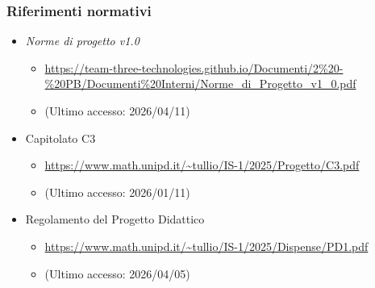 \documentclass[a4paper,12pt]{article}
\begin{document}
{            \subsubsection{Riferimenti normativi}
                \begin{itemize}
                    \item \textit{Norme di progetto v1.0}
                    \begin{itemize}
                        \item \url{https://team-three-technologies.github.io/Documenti/2%20-%20PB/Documenti%20Interni/Norme_di_Progetto_v1_0.pdf}
                        \item[] (Ultimo accesso: 2026/04/11)
                    \end{itemize}
                    \item Capitolato C3
                    \begin{itemize}
                        \item \url{https://www.math.unipd.it/~tullio/IS-1/2025/Progetto/C3.pdf}
                        \item[] (Ultimo accesso: 2026/01/11)
                    \end{itemize}
                    \item Regolamento del Progetto Didattico
                    \begin{itemize}
                        \item \url{https://www.math.unipd.it/~tullio/IS-1/2025/Dispense/PD1.pdf}
                        \item[] (Ultimo accesso: 2026/04/05)
                    \end{itemize}
                \end{itemize}
}
\end{document}
